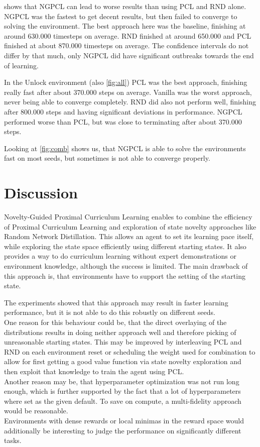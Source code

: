 \documentclass{article}
\begin{document}
 shows that NGPCL can lead to worse results than using PCL and RND alone. NGPCL was the fastest to get decent results, but then failed to converge to solving the environment. The best approach here was the baseline, finishing at around 630.000 timesteps on average. RND finished at around 650.000 and PCL finished at about 870.000 timesteps on average. The confidence intervals do not differ by that much, only NGPCL did have significant outbreaks towards the end of learning.

In the Unlock environment (also \cref{fig:all}) PCL was the best approach, finishing really fast after about 370.000 steps on average. Vanilla was the worst approach, never being able to converge completely. RND did also not perform well, finishing after 800.000 steps and having significant deviations in performance. NGPCL performed worse than PCL, but was close to terminating after about 370.000 steps.

Looking at \cref{fig:comb} shows us, that NGPCL is able to solve the environments fast on most seeds, but sometimes is not able to converge properly.


\section{Discussion}
Novelty-Guided Proximal Curriculum Learning enables to combine the efficiency of Proximal Curriculum Learning and exploration of state novelty approaches like Random Network Distillation. This allows an agent to set its learning pace itself, while exploring the state space efficiently using different starting states. It also provides a way to do curriculum learning without expert demonstrations or environment knowledge, although the success is limited. The main drawback of this approach is, that environments have to support the setting of the starting state.

The experiments showed that this approach may result in faster learning performance, but it is not able to do this robustly on different seeds. \\
One reason for this behaviour could be, that the direct overlaying of the distributions results in doing neither approach well and therefore picking of unreasonable starting states. This may be improved by interleaving PCL and RND on each environment reset or scheduling the weight used for combination to allow for first getting a good value function via state novelty exploration and then exploit that knowledge to train the agent using PCL. \\
Another reason may be, that hyperparameter optimization was not run long enough, which is further supported by the fact that a lot of hyperparameters where set as the given default. To save on compute, a multi-fidelity approach would be reasonable. \\
Environments with dense rewards or local minimas in the reward space would additionally be interesting to judge the performance on significantly different tasks.
\end{document}
